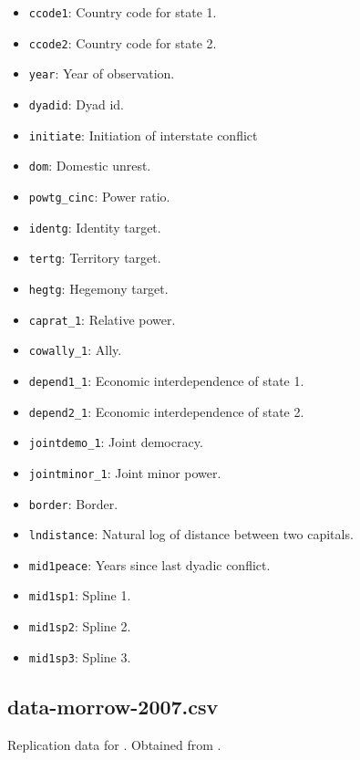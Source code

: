 \documentclass[12pt]{article}
\begin{document}
\begin{itemize}
  \item \texttt{ccode1}: Country code for state 1.
  \item \texttt{ccode2}: Country code for state 2. 
  \item \texttt{year}: Year of observation.
  \item \texttt{dyadid}: Dyad id.
  \item \texttt{initiate}: Initiation of interstate conflict
  \item \texttt{dom}: Domestic unrest.
  \item \texttt{powtg\_cinc}: Power ratio.
  \item \texttt{identg}: Identity target.
  \item \texttt{tertg}: Territory target. 
  \item \texttt{hegtg}: Hegemony target.
  \item \texttt{caprat\_1}: Relative power.
  \item \texttt{cowally\_1}: Ally.
  \item \texttt{depend1\_1}: Economic interdependence of state 1.
  \item \texttt{depend2\_1}: Economic interdependence of state 2.
  \item \texttt{jointdemo\_1}: Joint democracy.
  \item \texttt{jointminor\_1}: Joint minor power.
  \item \texttt{border}: Border.
  \item \texttt{lndistance}: Natural log of distance between two capitals.
  \item \texttt{mid1peace}: Years since last dyadic conflict.
  \item \texttt{mid1sp1}: Spline 1.
  \item \texttt{mid1sp2}: Spline 2.
  \item \texttt{mid1sp3}: Spline 3.
\end{itemize}

\subsection{data-morrow-2007.csv}

Replication data for \citet{morrow2007}.
Obtained from \citet{morrow2007data}.
\end{document}
